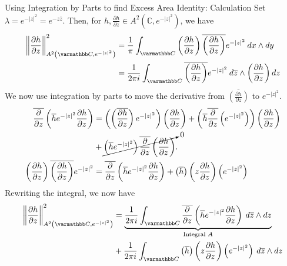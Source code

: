\documentclass{reu_beamer}
\begin{document}
\begin{frame}[allowframebreaks]{Using Integration by Parts to find Excess Area Identity: Calculation}
  \footnotesize
  Set $\lambda = e^{-|z|^2} = e^{-z\overline{z}}$. Then, for $h,\frac{\partial h}{\partial z} \in A^{2}\left(\mathbb{C},e^{-|z|^2}\right)$, we have
  \begin{align*}
    \norm{\frac{\partial h}{\partial z}}_{A^2\left(\mathbb{C},e^{-|z|^2}\right)}^2 &= \frac{1}{\pi}\int_{\C}^{} \left(\frac{\partial h}{\partial z}\right)\overline{\left(\frac{\partial h}{\partial z}\right)}e^{-|z|^2}\:dx\wedge dy\\
                                                                                   &= \frac{1}{2\pi i}\int_{\C}^{} \overline{\left(\frac{\partial h}{\partial z}\right)}e^{-|z|^2}\:d\overline{z}\wedge \left(\frac{\partial h}{\partial z}\right) dz
  \end{align*}
  We now use integration by parts to move the derivative from $\overline{\left(\frac{\partial h}{\partial z}\right)}$ to $e^{-|z|^2}$.
  \begin{align*}
    \overline{\frac{\partial}{\partial z}}\left(\overline{h}e^{-|z|^2}\frac{\partial h}{\partial z}\right) &= \left(\left(\overline{\frac{\partial h}{\partial z}}\right)e^{-|z|^2}\right)\left(\frac{\partial h}{\partial z}\right) + \left(\overline{h}\overline{\frac{\partial}{\partial z}}\left(e^{-|z|^2}\right)\right)\left(\frac{\partial h}{\partial z}\right)\\
                                                                                                           &+ \cancelto{0}{\left(\overline{h}e^{-|z|^2}\right)\overline{\frac{\partial}{\partial z}}\left(\frac{\partial h}{\partial z}\right)}.\\
    \left(\frac{\partial h}{\partial z}\right)\overline{\left(\frac{\partial h}{\partial z}\right)}e^{-|z|^2} &= \overline{\frac{\partial }{\partial z}}\left(\overline{h}e^{-|z|^2}\frac{\partial h}{\partial z}\right) + \left(\overline{h}\right)\left(z\frac{\partial h}{\partial z}\right)\left(e^{-|z|^2}\right)
  \end{align*}
  Rewriting the integral, we now have
  \begin{align*}
    \norm{\frac{\partial h}{\partial z}}_{A^{2}\left(\C,e^{-|z|^2}\right)}^2 &= \underbrace{\frac{1}{2\pi i}\int_{\C}^{} \overline{\frac{\partial }{\partial z}}\left(\overline{h}e^{-|z|^2}\frac{\partial h}{\partial z}\right)\:d\overline{z}\wedge dz}_{\text{Integral $A$}}\\
                                                                             &+ \frac{1}{2\pi i}\int_{\C}^{} \left(\overline{h}\right)\left(z\frac{\partial h}{\partial z}\right)\left(e^{-|z|^2}\right)\:d\overline{z}\wedge dz

\end{align*}
\end{frame}
\end{document}
